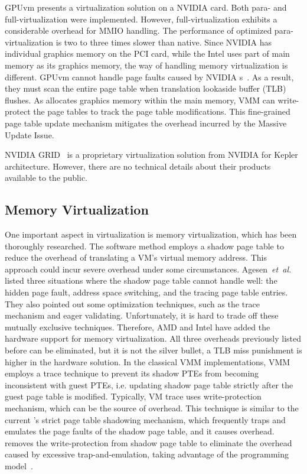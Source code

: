 GPUvm presents a \gpu{} virtualization solution on a NVIDIA card. Both para- and full-virtualization were implemented. However, full-virtualization exhibits a considerable overhead for MMIO handling. The performance of optimized para-virtualization is two to three times slower than native. Since NVIDIA has individual graphics memory on the PCI card, while the Intel \gpu{} uses part of main memory as its graphics memory, the way of handling memory virtualization is different. GPUvm cannot handle page faults caused by NVIDIA \gpu{}s~{\cite{gottschlag2013logv}}. As a result, they must scan the entire page table when translation lookaside buffer (TLB) flushes. As \name{} allocates graphics memory within the main memory, VMM can write-protect the page tables to track the page table modifications. This fine-grained page table update mechanism mitigates the overhead incurred by the Massive Update Issue.

NVIDIA GRID~{\cite{website:nvidiagrid}} is a proprietary virtualization solution from NVIDIA for Kepler architecture. However, there are no technical details about their products available to the public.

\subsection{Memory Virtualization}

One important aspect in \gpu{} virtualization is memory virtualization, which has been thoroughly researched. The software method employs a shadow page table to reduce the overhead of translating a VM's virtual memory address. This approach could incur severe overhead under some circumstances. Agesen~\emph{et~al.}~{\cite{agesen2010evolution}} listed three situations where the shadow page table cannot handle well: the hidden page fault, address space switching, and the tracing page table entries. They also pointed out some optimization techniques, such as the trace mechanism and eager validating. Unfortunately, it is hard to trade off these mutually exclusive techniques. Therefore, AMD and Intel have added the hardware support for memory virtualization. All three overheads previously listed before can be eliminated, but it is not the silver bullet, a TLB miss punishment is higher in the hardware solution.
\hspace{0pt}
In the classical VMM implementations, VMM employs a trace technique to prevent its shadow PTEs from becoming inconsistent with guest PTEs, i.e. updating shadow page table strictly after the guest page table is modified. Typically, VM trace uses write-protection mechanism, which can be the source of overhead. This technique is similar to the current \gvirt{}'s strict page table shadowing mechanism, which frequently traps and emulates the page faults of the shadow page table, and it causes overhead. \name{} removes the write-protection from shadow page table to eliminate the overhead caused by excessive trap-and-emulation, taking advantage of the \gpu{} programming model~{\cite{adams2006comparison}}.
